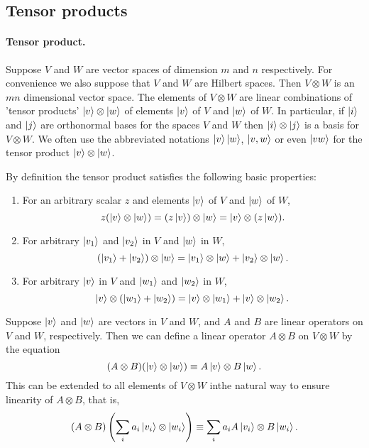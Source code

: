 \documentclass{article}
\begin{document}
\subsection{Tensor products}

\paragraph{Tensor product.} Suppose $V$ and $W$ are vector spaces of dimension
$m$ and $n$ respectively. For convenience we also suppose that $V$ and $W$ are
Hilbert spaces. Then $V \otimes W$ is an $mn$ dimensional vector space. The
elements of $V \otimes W$ are linear combinations of 'tensor products' $\ket{v}
\otimes \ket{w}$ of elements $\ket{v}$ of $V$ and $\ket{w}$ of $W$. In
particular, if $\ket{i}$ and $\ket{j}$ are orthonormal bases for the spaces $V$
and $W$ then $\ket{i} \otimes \ket{j}$ is a basis for $V \otimes W$. We often
use the abbreviated notations $\ket{v}\ket{w}$, $\ket{v, w}$ or even $\ket{vw}$
for the tensor product $\ket{v} \otimes \ket{w}$.

By definition the tensor product satisfies the following basic properties:
\begin{enumerate}
  \item For an arbitrary scalar $z$ and elements $\ket{v}$ of $V$ and $\ket{w}$
    of $W$, \begin{equation*}
      z(\ket{v} \otimes \ket{w}) = (z\ket{v}) \otimes \ket{w} = \ket{v} \otimes
        (z\ket{w}).
  \end{equation*}
  \item For arbitrary $\ket{v_1}$ and $\ket{v_2}$ in $V$ and $\ket{w}$ in $W$,
    \begin{equation*}
      (\ket{v_1} + \ket{v_2}) \otimes \ket{w} = \ket{v_1} \otimes \ket{w} +
        \ket{v_2} \otimes \ket{w}.
    \end{equation*}
  \item For arbitrary $\ket{v}$ in $V$ and $\ket{w_1}$ and $\ket{w_2}$ in $W$,
    \begin{equation*}
      \ket{v} \otimes (\ket{w_1} + \ket{w_2}) = \ket{v} \otimes \ket{w_1} +
        \ket{v} \otimes \ket{w_2}.
    \end{equation*}
\end{enumerate}

Suppose $\ket{v}$ and $\ket{w}$ are vectors in $V$ and $W$, and $A$ and $B$ are
linear operators on $V$ and $W$, respectively. Then we can define a linear
operator $A \otimes B$ on $V \otimes W$ by the equation \begin{equation*}
  (A \otimes B)(\ket{v} \otimes \ket{w}) \equiv A\ket{v} \otimes B\ket{w}.
\end{equation*}
This can be extended to all elements of $V \otimes W$ inthe natural way to
ensure linearity of $A \otimes B$, that is, \begin{equation*}
  (A \otimes B)\left(\sum_i a_i\ket{v_i} \otimes \ket{w_i}\right)
    \equiv \sum_i a_iA\ket{v_i} \otimes B\ket{w_i}.
\end{equation*}
\end{document}
